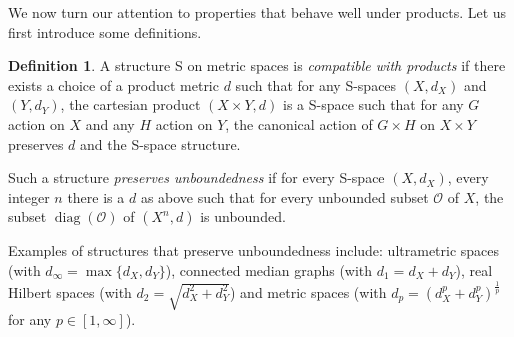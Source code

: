 \documentclass[a4paper]{article}
\theoremstyle{definition}
\newtheorem{defn}[lem]{Definition}
\theoremstyle{remark}%
\DeclareMathOperator\diag{diag}
\DeclareMathOperator\Hom{Hom}
\newcommand*{\orbite}{\mathcal O}
\begin{document}
We now turn our attention to properties that behave well under products. Let us first introduce some definitions.
%
%
\begin{defn}
A structure S on metric spaces is \emph{compatible with products} if there exists a choice of a product metric $d$ such that for any S-spaces $(X,d_X)$ and $(Y,d_Y)$, the cartesian product $(X\times Y,d)$ is a S-space such that for any $G$ action on $X$ and any $H$ action on $Y$, the canonical action of $G\times H$ on $X\times Y$ preserves $d$ and the S-space structure.

Such a structure \emph{preserves unboundedness} if for every S-space $(X,d_X)$, every integer $n$ there is a $d$ as above such that for every unbounded subset $\orbite$ of $X$, the subset $\diag(\orbite)$ of $(X^n,d)$ is unbounded.%
\end{defn}
%
%
Examples of structures that preserve unboundedness include: ultrametric spaces (with $d_\infty=\max\{d_X,d_Y\}$), connected median graphs (with $d_1=d_X+d_Y$), real Hilbert spaces (with $d_2=\sqrt{d_X^2+d_Y^2}$) and metric spaces (with $d_p=(d_X^p+d_Y^p)^{\frac1p}$ for any $p\in[1,\infty]$).
\end{document}
